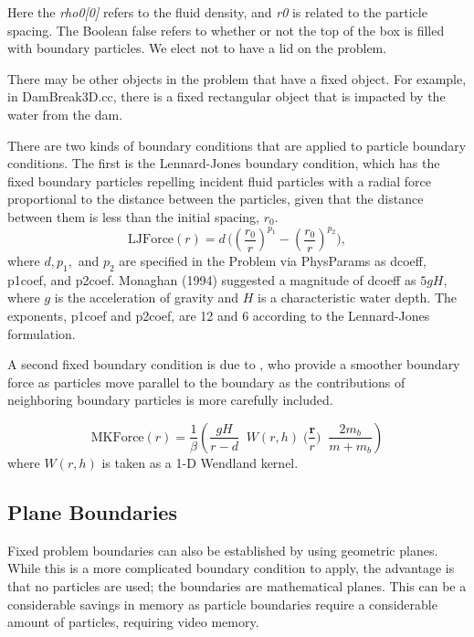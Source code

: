 \documentclass[12pt]{memoir}
\newcommand{\be}{\begin{equation}}
\newcommand{\en}{\end{equation}}
\renewcommand{\vec}[1]{\bm{#1}}
\begin{document}
Here the {\em rho0[0]} refers to the fluid density, and {\em r0} is
related to the particle spacing. The Boolean false refers to whether or
not the top of the box is filled with boundary particles. We elect not
to have a lid on the problem.

There may be other objects in the problem that have a fixed object. For
example, in DamBreak3D.cc, there is a fixed rectangular object that is
impacted by the water from the dam.

There are two kinds of boundary conditions that are applied to particle
boundary conditions. The first is the Lennard-Jones boundary condition,
which has the fixed boundary particles repelling incident fluid
particles with a radial force proportional to the distance between the
particles, given that the distance between them is less than the initial
spacing, $r_0$. \be \mbox{LJForce}(r) = d \, \Big( (
\frac{r_0}{r})^{p_1} - (\frac{r_0}{r})^{p_2}\Big), \en where $d, p_1,$
and $p_2$ are specified in the Problem via PhysParams as dcoeff,
p1coef, and p2coef. Monaghan (1994) suggested a magnitude of dcoeff as
$5 g H$, where $g$ is the acceleration of gravity and $H$ is a
characteristic water depth. The exponents, p1coef and p2coef, are 12
and 6 according to the Lennard-Jones formulation.

A second fixed boundary condition is due to \citet{monaghan_sph_2009}, who
provide a smoother boundary force as particles move parallel to the
boundary as the contributions of neighboring boundary particles is more
carefully included.

\be \mbox{MKForce}(r) = \frac{1}{\beta} \left( \frac{g H}{r-d}\;\;W(r,h)
\; \Big(\frac{\vec{r}}{r}\Big)\; \;\frac{2 m_b}{m + m_b}\right) \en
where $W(r,h)$ is taken as a 1-D Wendland kernel.

\subsection{Plane Boundaries}

Fixed problem boundaries can also be established by using geometric
planes. While this is a more complicated boundary condition to apply,
the advantage is that no particles are used; the boundaries are
mathematical planes. This can be a considerable savings in memory as
particle boundaries require a considerable amount of particles,
requiring video memory.
\end{document}
